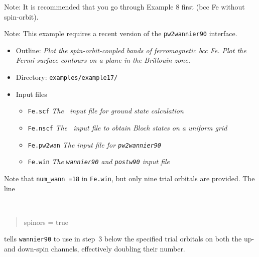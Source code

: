 \documentclass[a4paper,11pt,twoside]{article}
\begin{document}




Note: It is recommended that you go through Example 8 first (bcc Fe
without spin-orbit).

Note: This example requires a recent version of the {\tt pw2wannier90} interface.

\begin{itemize}
\item{Outline: \it{Plot the spin-orbit-coupled bands of ferromagnetic
      bcc Fe.  Plot the Fermi-surface contours on a plane in the
      Brillouin zone.}}
\item{Directory: {\tt examples/example17/}}
\item{Input files}
\begin{itemize}
\item{ {\tt Fe.scf} {\it The \pwscf\ input file for ground state
    calculation}}
\item{ {\tt Fe.nscf}  {\it The \pwscf\ input file to obtain Bloch
    states on a uniform grid}} 
\item{ {\tt Fe.pw2wan}  {\it The input file for {\tt pw2wannier90}}}

\item{ {\tt Fe.win}  {\it The {\tt wannier90} and {\tt postw90} input file}}
\end{itemize}
\end{itemize}

Note that {\tt num\_wann =18} in {\tt Fe.win}, but only nine trial
orbitals are provided. The line
  {\tt
\begin{quote}
spinors = true
\end{quote}
}tells {\tt wannier90} to use in step~3 below the specified trial
orbitals on both the up- and down-spin channels, effectively doubling
their number.
\end{document}
